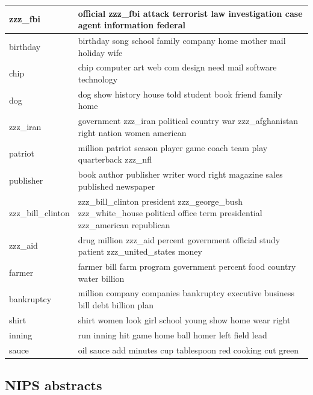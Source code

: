 \documentclass{article}
\begin{document}
\begin{tabular}{ l | l }
    zzz\_fbi & official zzz\_fbi attack terrorist law investigation case agent information federal \\ \hline 
    birthday & birthday song school family company home mother mail holiday wife \\ \hline 
    chip & chip computer art web com design need mail software technology \\ \hline 
    dog & dog show history house told student book friend family home \\ \hline 
    zzz\_iran & government zzz\_iran political country war zzz\_afghanistan right nation women american \\ \hline 
    patriot & million patriot season player game coach team play quarterback zzz\_nfl \\ \hline 
    publisher & book author publisher writer word right magazine sales published newspaper \\ \hline 
    zzz\_bill\_clinton & zzz\_bill\_clinton president zzz\_george\_bush zzz\_white\_house political office term presidential zzz\_american republican \\ \hline 
    zzz\_aid & drug million zzz\_aid percent government official study patient zzz\_united\_states money \\ \hline 
    farmer & farmer bill farm program government percent food country water billion \\ \hline 
    bankruptcy & million company companies bankruptcy executive business bill debt billion plan \\ \hline 
    shirt & shirt women look girl school young show home wear right \\ \hline 
    inning & run inning hit game home ball homer left field lead \\ \hline 
    sauce & oil sauce add minutes cup tablespoon red cooking cut green \\ \hline 
  \end{tabular}

\subsection{NIPS abstracts}
\end{document}
